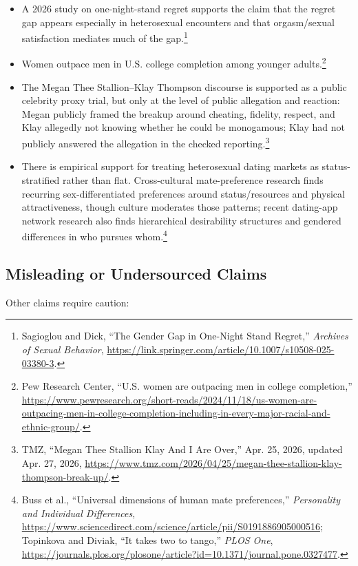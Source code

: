 \documentclass[12pt]{article}
\newcommand{\SourceNote}[1]{\footnote{#1}}
\begin{document}
\begin{itemize}
  \item A 2026 study on one-night-stand regret supports the claim that the regret gap appears especially in heterosexual encounters and that orgasm/sexual satisfaction mediates much of the gap.\SourceNote{Sagioglou and Dick, ``The Gender Gap in One-Night Stand Regret,'' \textit{Archives of Sexual Behavior}, \url{https://link.springer.com/article/10.1007/s10508-025-03380-3}.}
  \item Women outpace men in U.S. college completion among younger adults.\SourceNote{Pew Research Center, ``U.S. women are outpacing men in college completion,'' \url{https://www.pewresearch.org/short-reads/2024/11/18/us-women-are-outpacing-men-in-college-completion-including-in-every-major-racial-and-ethnic-group/}.}
  \item The Megan Thee Stallion--Klay Thompson discourse is supported as a public celebrity proxy trial, but only at the level of public allegation and reaction: Megan publicly framed the breakup around cheating, fidelity, respect, and Klay allegedly not knowing whether he could be monogamous; Klay had not publicly answered the allegation in the checked reporting.\SourceNote{TMZ, ``Megan Thee Stallion Klay And I Are Over,'' Apr. 25, 2026, updated Apr. 27, 2026, \url{https://www.tmz.com/2026/04/25/megan-thee-stallion-klay-thompson-break-up/}.}
  \item There is empirical support for treating heterosexual dating markets as status-stratified rather than flat. Cross-cultural mate-preference research finds recurring sex-differentiated preferences around status/resources and physical attractiveness, though culture moderates those patterns; recent dating-app network research also finds hierarchical desirability structures and gendered differences in who pursues whom.\SourceNote{Buss et al., ``Universal dimensions of human mate preferences,'' \textit{Personality and Individual Differences}, \url{https://www.sciencedirect.com/science/article/pii/S0191886905000516}; Topinkova and Diviak, ``It takes two to tango,'' \textit{PLOS One}, \url{https://journals.plos.org/plosone/article?id=10.1371/journal.pone.0327477}.}
\end{itemize}

\subsection{Misleading or Undersourced Claims}

Other claims require caution:
\end{document}
